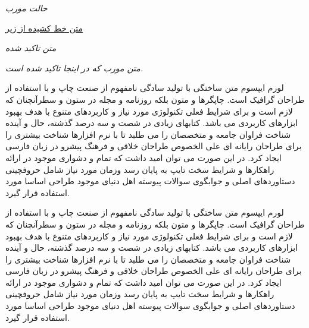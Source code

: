 \documentclass[11pt]{article}
\begin{document}
\textit{حالت مورب}

\underline{متن خط کشیده از زیر}


\emph{متن تاکید شده}

\textit{متن مورب که در \emph{اینجا} تاکید شده است.}

\begin{flushleft}
	لورم ایپسوم متن ساختگی با تولید سادگی نامفهوم از صنعت چاپ و با استفاده از طراحان گرافیک است. چاپگرها و متون بلکه روزنامه و مجله در ستون و سطرآنچنان که لازم است و برای شرایط فعلی تکنولوژی مورد نیاز و کاربردهای متنوع با هدف بهبود ابزارهای کاربردی می باشد. کتابهای زیادی در شصت و سه درصد گذشته، حال و آینده شناخت فراوان جامعه و متخصصان را می طلبد تا با نرم افزارها شناخت بیشتری را برای طراحان رایانه ای علی الخصوص طراحان خلاقی و فرهنگ پیشرو در زبان فارسی ایجاد کرد. در این صورت می توان امید داشت که تمام و دشواری موجود در ارائه راهکارها و شرایط سخت تایپ به پایان رسد وزمان مورد نیاز شامل حروفچینی دستاوردهای اصلی و جوابگوی سوالات پیوسته اهل دنیای موجود طراحی اساسا مورد استفاده قرار گیرد.
\end{flushleft}

\begin{flushright}
لورم ایپسوم متن ساختگی با تولید سادگی نامفهوم از صنعت چاپ و با استفاده از طراحان گرافیک است. چاپگرها و متون بلکه روزنامه و مجله در ستون و سطرآنچنان که لازم است و برای شرایط فعلی تکنولوژی مورد نیاز و کاربردهای متنوع با هدف بهبود ابزارهای کاربردی می باشد. کتابهای زیادی در شصت و سه درصد گذشته، حال و آینده شناخت فراوان جامعه و متخصصان را می طلبد تا با نرم افزارها شناخت بیشتری را برای طراحان رایانه ای علی الخصوص طراحان خلاقی و فرهنگ پیشرو در زبان فارسی ایجاد کرد. در این صورت می توان امید داشت که تمام و دشواری موجود در ارائه راهکارها و شرایط سخت تایپ به پایان رسد وزمان مورد نیاز شامل حروفچینی دستاوردهای اصلی و جوابگوی سوالات پیوسته اهل دنیای موجود طراحی اساسا مورد استفاده قرار گیرد.
\end{flushright}
\end{document}

